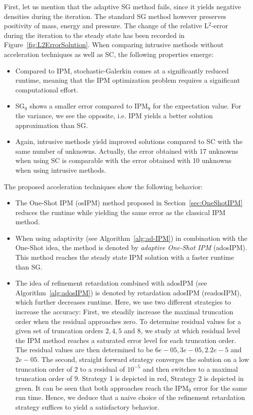First, let us mention that the adaptive SG method fails, since it yields negative densities during the iteration. The standard SG method however preserves positivity of mass, energy and pressure. The change of the relative L$^2$-error during the iteration to the steady state has been recorded in Figure~\ref{fig:L2ErrorSolution}. When comparing intrusive methods without acceleration techniques as well as SC, the following properties emerge:
\begin{itemize}
\item Compared to IPM, stochastic-Galerkin comes at a significantly reduced runtime, meaning that the IPM optimization problem requires a significant computational effort.
\item SG$_9$ shows a smaller error compared to IPM$_9$ for the expectation value. For the variance, we see the opposite, i.e. IPM yields a better solution approximation than SG.
\item Again, intrusive methods yield improved solutions compared to SC with the same number of unknowns. Actually, the error obtained with 17 unknowns when using SC is comparable with the error obtained with 10 unknowns when using intrusive methods.
\end{itemize}
The proposed acceleration techniques show the following behavior:
\begin{itemize}
\item The One-Shot IPM (osIPM) method proposed in Section~\ref{sec:OneShotIPM} reduces the runtime while yielding the same error as the classical IPM method.
\item When using adaptivity (see Algorithm~\ref{alg:ad-IPM}) in combination with the One-Shot idea, the method is denoted by \textit{adaptive One-Shot IPM} (adosIPM). This method reaches the steady state IPM solution with a faster runtime than SG.
\item The idea of refinement retardation combined with adosIPM (see Algorithm~\ref{alg:adosIPM}) is denoted by retardation adosIPM (readosIPM), which further decreases runtime. Here, we use two different strategies to increase the accuracy: First, we steadily increase the maximal truncation order when the residual approaches zero. To determine residual values for a given set of truncation orders $2,4,5$ and $8$, we study at which residual level the IPM method reaches a saturated error level for each truncation order. The residual values are then determined to be $6e-05,3e-05,2.2e-5$ and $2e-05$. The second, straight forward strategy converges the solution on a low truncation order of $2$ to a residual of $10^{-5}$ and then switches to a maximal truncation order of $9$. Strategy 1 is depicted in red, Strategy 2 is depicted in green. It can be seen that both approaches reach the IPM$_9$ error for the same run time. Hence, we deduce that a naive choice of the refinement retardation strategy suffices to yield a satisfactory behavior.
\end{itemize}

